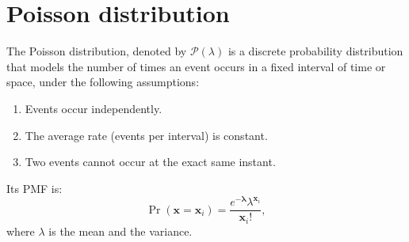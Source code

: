 
\section{Poisson distribution}
\label{sec:poisson_distribution}

The Poisson distribution, denoted by $\mathcal{P}(\lambda)$ is a
discrete probability distribution that models the number of times an
event occurs in a fixed interval of time or space, under the following
assumptions:
\begin{enumerate}
\item Events occur independently.
\item The average rate (events per interval) is constant.
\item Two events cannot occur at the exact same instant.
\end{enumerate}
Its \gls{PMF} is:
\begin{equation}
  \Pr(\mathbf{x}{=}\mathbf{x}_i) = \frac{e^{-\mathbf{\lambda}}\lambda^{\mathbf{x}_i}}{\mathbf{x}_i!},
  \label{eq:PN}
\end{equation}
where $\lambda$ is the mean and the variance.




